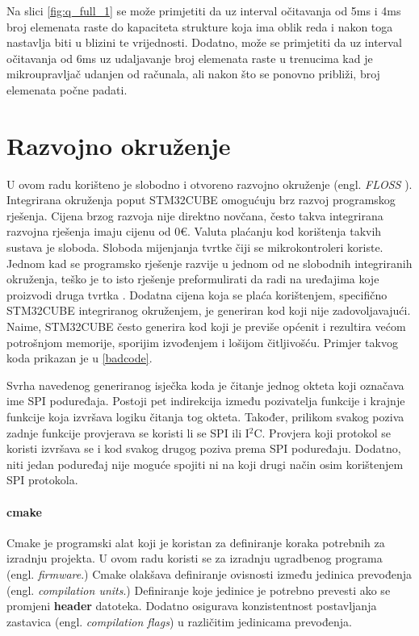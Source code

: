 \documentclass[times, utf8, diplomski]{diplomski}
\begin{document}
Na slici \ref{fig:q_full_1} se može primjetiti da uz interval očitavanja od 5ms i 4ms broj elemenata raste do kapaciteta strukture koja ima oblik reda i nakon toga nastavlja biti u blizini te vrijednosti.
Dodatno, može se primjetiti da uz interval očitavanja od 6ms uz udaljavanje broj elemenata raste u trenucima kad je mikroupravljač udanjen od računala, ali nakon što se ponovno približi, broj elemenata počne padati.

\chapter{Razvojno okruženje}
U ovom radu korišteno je slobodno i otvoreno razvojno okruženje (engl. \textit{FLOSS} \cite{FLOSS}). Integrirana okruženja poput STM32CUBE omogućuju brz razvoj programskog rješenja. Cijena brzog razvoja nije direktno novčana, često takva integrirana razvojna rješenja imaju cijenu od 0€. Valuta plaćanju kod korištenja takvih sustava je sloboda. Sloboda mijenjanja tvrtke čiji se mikrokontroleri koriste. Jednom kad se programsko rješenje razvije u jednom od ne slobodnih integriranih okruženja, teško je to isto rješenje preformulirati da radi na uređajima koje proizvodi druga tvrtka \cite{VENDORLOCKIN}. Dodatna cijena koja se plaća korištenjem, specifično STM32CUBE integriranog okruženjem, je generiran kod koji nije zadovoljavajući. Naime, STM32CUBE često generira kod koji je previše općenit i rezultira većom potrošnjom memorije, sporijim izvođenjem i lošijom čitljivošću. Primjer takvog koda prikazan je u \ref{badcode}.



Svrha navedenog generiranog isječka koda je čitanje jednog okteta koji označava ime SPI poduređaja. Postoji pet indirekcija između pozivatelja funkcije i krajnje funkcije koja izvršava logiku čitanja tog okteta. Također, prilikom svakog poziva zadnje funkcije provjerava se koristi li se SPI ili I\(^2\)C. Provjera koji protokol se koristi izvršava se i kod svakog drugog poziva prema SPI poduređaju. Dodatno, niti jedan poduređaj nije moguće spojiti ni na koji drugi način osim korištenjem SPI protokola.

\subsubsection{cmake}
Cmake je programski alat koji je koristan za definiranje koraka potrebnih za izradnju projekta. U ovom radu koristi se za izradnju ugradbenog programa (engl. \textit{firmware}.) Cmake olakšava definiranje ovisnosti između jedinica prevođenja (engl. \textit{compilation units}.) Definiranje koje jedinice je potrebno prevesti ako se promjeni \textbf{header} datoteka. Dodatno osigurava konzistentnost postavljanja zastavica (engl. \textit{compilation flags}) u različitim jedinicama prevođenja.
\end{document}
